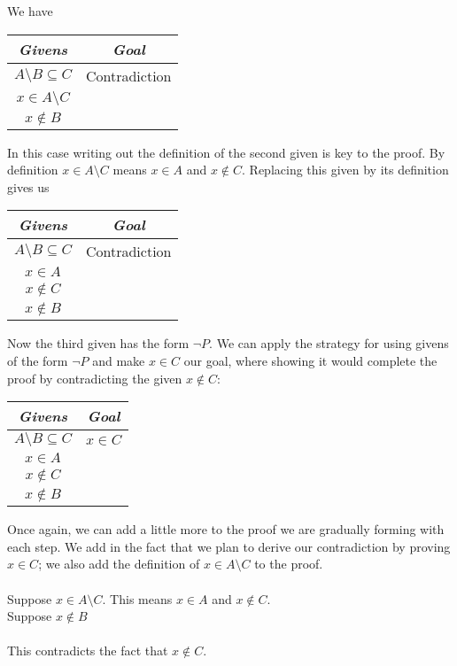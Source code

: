 \documentclass{report}
\begin{document}
We have
\begin{center}
\begin{tabular}{c|c}
\textit{Givens}&\textit{Goal}\\
\hline
$A\setminus B\subseteq C$&Contradiction\\
$x\in A\setminus C$&\\
$x\notin B$&
\end{tabular}
\end{center}
In this case writing out the definition of the second given is key to the proof. By definition $x\in A\setminus C$ means $x\in A$ and $x\notin C$. Replacing this given
by its definition gives us
\begin{center}
\begin{tabular}{c|c}
\textit{Givens}&\textit{Goal}\\
\hline
$A\setminus B\subseteq C$&Contradiction\\
$x\in A$&\\
$x\notin C$&\\
$x\notin B$&
\end{tabular}
\end{center}
Now the third given has the form $\neg P$. We can apply the strategy for using givens of the form $\neg P$ and make $x\in C$ our goal, where showing it would complete the proof by contradicting
the given $x\notin C$:
\begin{center}
\begin{tabular}{c|c}
\textit{Givens}&\textit{Goal}\\
\hline
$A\setminus B\subseteq C$&$x\in C$\\
$x\in A$&\\
$x\notin C$&\\
$x\notin B$&
\end{tabular}
\end{center}
Once again, we can add a little more to the proof we are gradually forming with each step. We add in the fact that we plan to derive our contradiction by proving $x\in C$; we
also add the definition of $x\in A\setminus C$ to the proof.\\
\vspace{1mm}\\
\indent Suppose $x\in A\setminus C$. This means $x\in A$ and $x\notin C$.\\
\indent\indent Suppose $x\notin B$\\
\indent\indent\indent{}\\
\indent\indent\indent This contradicts the fact that $x\notin C$.\\
\end{document}

